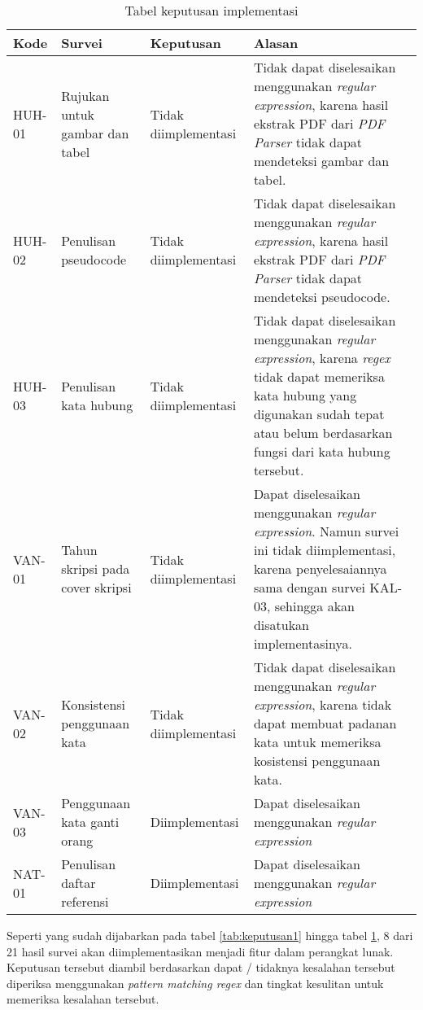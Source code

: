 \begin{table}[H]
	\caption {Tabel keputusan implementasi} \label{tab:keputusan3}
	\begin{center}
		\begin{tabular}{|p{1.5 cm}|>{\raggedright} p{4 cm}| p{2.5 cm}| p{6.5 cm}|}
		\hline
		Kode & Survei & Keputusan & Alasan \\ 
		\hline
		HUH-01 & Rujukan untuk gambar dan tabel & Tidak \newline diimplementasi & Tidak dapat diselesaikan menggunakan \textit{regular expression}, karena hasil ekstrak PDF dari \textit{PDF Parser} tidak dapat mendeteksi gambar dan tabel. \newline \\ 
		\hline 
		HUH-02 & Penulisan pseudocode & Tidak \newline diimplementasi & Tidak dapat diselesaikan menggunakan \textit{regular expression}, karena hasil ekstrak PDF dari \textit{PDF Parser} tidak dapat mendeteksi pseudocode. \newline \\ 
		\hline 
		HUH-03 & Penulisan kata hubung & Tidak \newline diimplementasi & Tidak dapat diselesaikan menggunakan \textit{regular expression}, karena \textit{regex} tidak dapat memeriksa kata hubung yang digunakan sudah tepat atau belum berdasarkan fungsi dari kata hubung tersebut. \newline \\ 
		\hline 
		VAN-01 & Tahun skripsi pada cover skripsi & Tidak \newline diimplementasi & Dapat diselesaikan menggunakan \textit{regular expression}. Namun survei ini tidak diimplementasi, karena penyelesaiannya sama dengan survei KAL-03, sehingga
akan disatukan implementasinya. \newline \\ 
		\hline 
		VAN-02 & Konsistensi penggunaan kata & Tidak \newline diimplementasi & Tidak dapat diselesaikan menggunakan \textit{regular expression}, karena \newline tidak dapat membuat padanan kata untuk memeriksa kosistensi penggunaan kata. \\ 
		\hline 
		VAN-03 & Penggunaan kata ganti orang & Diimplementasi & Dapat diselesaikan menggunakan \textit{regular expression} \newline \\ 
		\hline 
		NAT-01 & Penulisan daftar referensi & Diimplementasi & Dapat diselesaikan menggunakan \textit{regular expression} \newline \\ 
		\hline
		\end{tabular}
	\end{center}
\end{table}

Seperti yang sudah dijabarkan pada tabel \ref{tab:keputusan1} hingga tabel \ref{tab:keputusan3}, 8 dari 21 hasil survei akan diimplementasikan menjadi fitur dalam perangkat lunak. Keputusan tersebut diambil berdasarkan dapat / tidaknya kesalahan tersebut diperiksa menggunakan \textit{pattern matching regex} dan tingkat kesulitan untuk memeriksa kesalahan tersebut.